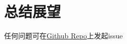 \chapter{总结展望}

任何问题可在\href{https://github.com/kongxiao0532/NKU\_Bachelor\_Thesis\_Template/issues/new}{Github Repo}上发起issue